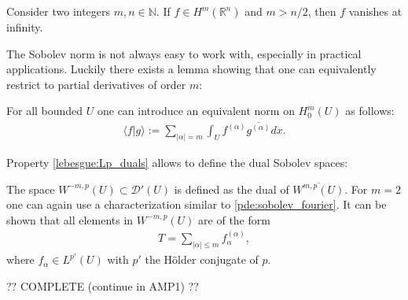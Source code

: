     \begin{property}
        Consider two integers $m,n\in\mathbb{N}$. If $f\in H^m(\mathbb{R}^n)$ and $m>n/2$, then $f$ vanishes at infinity.
    \end{property}

    The Sobolev norm is not always easy to work with, especially in practical applications. Luckily there exists a lemma showing that one can equivalently restrict to partial derivatives of order $m$:
    \begin{theorem}[Friedrich]
        For all bounded $U$ one can introduce an equivalent norm on $H^m_0(U)$ as follows:
        \begin{gather}
            \langle f|g \rangle := \sum_{|\alpha|=m}\int_U f^{(\alpha)}\overline{g^{(\alpha)}}dx.
        \end{gather}
    \end{theorem}

    Property \ref{lebesgue:Lp_duals} allows to define the dual Sobolev spaces:
    \begin{definition}
        The space $W^{-m,p}(U)\subset\mathcal{D}'(U)$ is defined as the dual of $\overline{W^{m,p}(U)}$. For $m=2$ one can again use a characterization similar to \eqref{pde:sobolev_fourier}. It can be shown that all elements in $W^{-m,p}(U)$ are of the form
        \begin{gather}
            T = \sum_{|\alpha|\leq m}f^{(\alpha)}_\alpha,
        \end{gather}
        where $f_\alpha\in L^{p'}(U)$ with $p'$ the H\"older conjugate of $p$.
    \end{definition}

    ?? COMPLETE (continue in AMP1) ??